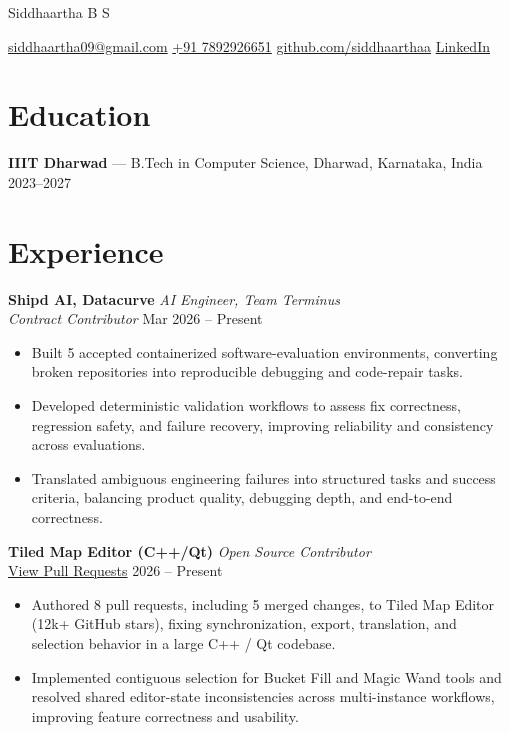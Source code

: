 \documentclass[11pt]{article}
\begin{document}
\centerline{\Huge Siddhaartha B S}

\vspace{4pt}

\centerline{
  \href{mailto:siddhaartha09@gmail.com}{siddhaartha09@gmail.com} \quad
  \href{tel:+917892926651}{+91 7892926651} \quad
  \href{https://github.com/SIDDHAARTHAA/}{github.com/siddhaarthaa} \quad
  \href{https://www.linkedin.com/in/siddhaartha-bs-041063364}{LinkedIn} \quad
}

\vspace{-6pt}

\section*{Education}

\textbf{IIIT Dharwad} --- B.Tech in Computer Science, Dharwad, Karnataka, India \hfill 2023--2027

\vspace{-10pt}

\section*{Experience}

\textbf{Shipd AI, Datacurve} \hfill \textit{AI Engineer, Team Terminus} \\
\textit{Contract Contributor} \hfill Mar 2026 -- Present
\vspace{-8pt}
\begin{itemize}
  \item Built 5 accepted containerized software-evaluation environments, converting broken repositories into reproducible debugging and code-repair tasks.
  \item Developed deterministic validation workflows to assess fix correctness, regression safety, and failure recovery, improving reliability and consistency across evaluations.
  \item Translated ambiguous engineering failures into structured tasks and success criteria, balancing product quality, debugging depth, and end-to-end correctness.
\end{itemize}

\textbf{Tiled Map Editor (C++/Qt)} \hfill \textit{Open Source Contributor} \\
\href{https://github.com/mapeditor/tiled/pulls?q=author\%3ASIDDHAARTHAA+}{View Pull Requests} \hfill 2026 -- Present
\vspace{-8pt}
\begin{itemize}
  \item Authored 8 pull requests, including 5 merged changes, to Tiled Map Editor (12k+ GitHub stars), fixing synchronization, export, translation, and selection behavior in a large C++ / Qt codebase.
  \item Implemented contiguous selection for Bucket Fill and Magic Wand tools and resolved shared editor-state inconsistencies across multi-instance workflows, improving feature correctness and usability.
\end{itemize}
\end{document}
